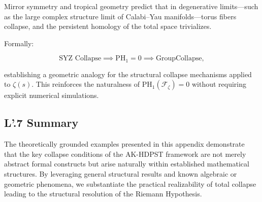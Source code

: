 \documentclass[11pt]{article}
\begin{document}
Mirror symmetry and tropical geometry predict that in degenerative limits—such as the large complex structure limit of Calabi–Yau manifolds—torus fibers collapse, and the persistent homology of the total space trivializes.

Formally:

\[
\text{SYZ Collapse} \implies \mathrm{PH}_1 = 0 \implies \mathrm{GroupCollapse},
\]

establishing a geometric analogy for the structural collapse mechanisms applied to $\zeta(s)$. This reinforces the naturalness of $\mathrm{PH}_1(\mathcal{F}_{\zeta}) = 0$ without requiring explicit numerical simulations.

\subsection*{L'.7 Summary}

The theoretically grounded examples presented in this appendix demonstrate that the key collapse conditions of the AK-HDPST framework are not merely abstract formal constructs but arise naturally within established mathematical structures. By leveraging general structural results and known algebraic or geometric phenomena, we substantiate the practical realizability of total collapse leading to the structural resolution of the Riemann Hypothesis.
\end{document}
